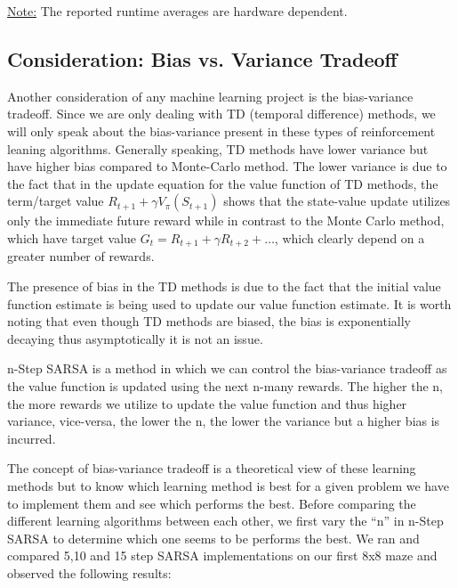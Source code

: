 \documentclass[final,12pt,3p]{elsarticle}
\begin{document}
\vspace{12pt}
\underline{Note:} The reported runtime averages are hardware dependent.

\subsection{Consideration: Bias vs. Variance Tradeoff}
\vspace{12pt}

Another consideration of any machine learning project is the bias-variance tradeoff. Since we are only dealing with TD (temporal difference) methods, we will only speak about the bias-variance present in these types of reinforcement leaning algorithms. Generally speaking, TD methods have lower variance but have higher bias compared to Monte-Carlo method. The lower variance is due to the fact that in the update equation for the value function of TD methods, the term/target value  $R_{t+1} + \gamma V_{\pi}(S_{t+1})$ shows that the state-value update utilizes only the immediate future reward while in contrast to the Monte Carlo method, which have target value $G_t = R_{t+1} + \gamma R_{t+2} + \ldots$, which clearly depend on a greater number of rewards.
\par
The presence of bias in the TD methods is due to the fact that the initial value function estimate is being used to update our value function estimate. It is worth noting that even though TD methods are biased, the bias is exponentially decaying thus asymptotically it is not an issue.
\par
n-Step SARSA is a method in which we can control the bias-variance tradeoff as the value function is updated using the next n-many rewards. The higher the n, the more rewards we utilize to update the value function and thus higher variance, vice-versa, the lower the n, the lower the variance but a higher bias is incurred.
\par
The concept of bias-variance tradeoff is a theoretical view of these learning methods but to know which learning method is best for a given problem we have to implement them and see which performs the best. Before comparing the different learning algorithms between each other, we first vary the “n” in n-Step SARSA to determine which one seems to be performs the best. We ran and compared 5,10 and 15 step SARSA implementations on our first 8x8 maze and observed the following results:
\end{document}
